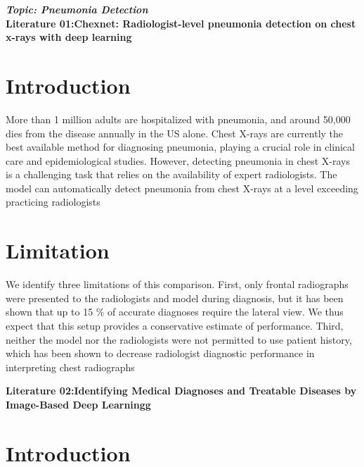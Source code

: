 \documentclass[openany,12pt,a4paper]{article}
\begin{document}
	\begin{center}
		\large\textbf{\textit{Topic: Pneumonia Detection }}\\
			\medskip
		\large\textbf{Literature 01:Chexnet: Radiologist-level pneumonia detection on chest x-rays with deep learning}\\
			\medskip
	\end{center}

\section{Introduction}
 More than 1 million adults are hospitalized with pneumonia, and around 50,000 dies from the disease annually in the US alone. Chest X-rays are currently the best available method for diagnosing pneumonia, playing a crucial role in clinical care and epidemiological studies. However, detecting pneumonia in chest X-rays is a challenging task that relies on the availability of expert radiologists. The model can automatically detect pneumonia from chest X-rays at a level exceeding practicing radiologists

\medskip

\section{Limitation}
We identify three limitations of this comparison. First, only frontal radiographs were presented to the radiologists and model during diagnosis, but it has been shown that up to 15 \% of accurate diagnoses require the lateral view. We thus expect that this setup provides a conservative estimate of performance. Third, neither the model nor the radiologists were not permitted to use patient history, which has been shown to decrease radiologist diagnostic performance in interpreting chest radiographs \cite{rajpurkar2017chexnet}\\
\medskip
\pagebreak

\begin{center}

	\large\textbf{Literature 02:Identifying Medical Diagnoses and Treatable Diseases by Image-Based Deep Learningg}\\
	\medskip
\end{center}
\medskip

\section{Introduction}
\end{document}
